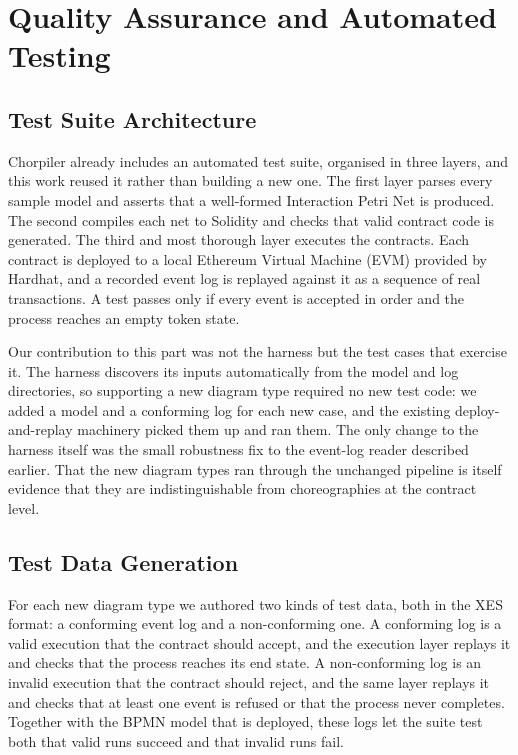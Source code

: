 \documentclass[runningheads]{llncs}
\begin{document}
\section{Quality Assurance and Automated Testing}
\label{sec:testing}

\subsection{Test Suite Architecture}
Chorpiler already includes an automated test suite, organised in three layers, and this work reused it rather than building a new one. The first layer parses every sample model and asserts that a well-formed Interaction Petri Net is produced. The second compiles each net to Solidity and checks that valid contract code is generated. The third and most thorough layer executes the contracts. Each contract is deployed to a local Ethereum Virtual Machine (EVM) provided by Hardhat, and a recorded event log is replayed against it as a sequence of real transactions. A test passes only if every event is accepted in order and the process reaches an empty token state.

Our contribution to this part was not the harness but the test cases that exercise it. The harness discovers its inputs automatically from the model and log directories, so supporting a new diagram type required no new test code: we added a model and a conforming log for each new case, and the existing deploy-and-replay machinery picked them up and ran them. The only change to the harness itself was the small robustness fix to the event-log reader described earlier. That the new diagram types ran through the unchanged pipeline is itself evidence that they are indistinguishable from choreographies at the contract level.

\subsection{Test Data Generation}
For each new diagram type we authored two kinds of test data, both in the XES format: a conforming event log and a non-conforming one. A conforming log is a valid execution that the contract should accept, and the execution layer replays it and checks that the process reaches its end state. A non-conforming log is an invalid execution that the contract should reject, and the same layer replays it and checks that at least one event is refused or that the process never completes. Together with the BPMN model that is deployed, these logs let the suite test both that valid runs succeed and that invalid runs fail.
\end{document}
